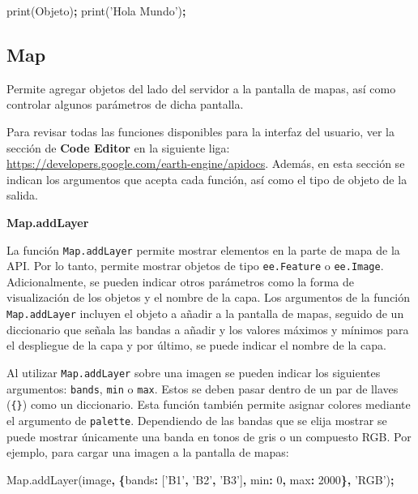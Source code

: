 \documentclass[
]{article}
\newenvironment{Shaded}{\begin{snugshade}}{\end{snugshade}}
\newcommand{\AttributeTok}[1]{\textcolor[rgb]{0.77,0.63,0.00}{#1}}
\newcommand{\DataTypeTok}[1]{\textcolor[rgb]{0.13,0.29,0.53}{#1}}
\newcommand{\DecValTok}[1]{\textcolor[rgb]{0.00,0.00,0.81}{#1}}
\newcommand{\NormalTok}[1]{#1}
\newcommand{\OperatorTok}[1]{\textcolor[rgb]{0.81,0.36,0.00}{\textbf{#1}}}
\newcommand{\StringTok}[1]{\textcolor[rgb]{0.31,0.60,0.02}{#1}}
\newcommand{\VariableTok}[1]{\textcolor[rgb]{0.00,0.00,0.00}{#1}}
\begin{document}
\begin{Shaded}
\begin{Highlighting}[]
\AttributeTok{print}\NormalTok{(Objeto)}\OperatorTok{;}
\AttributeTok{print}\NormalTok{(}\StringTok{'Hola Mundo'}\NormalTok{)}\OperatorTok{;}
\end{Highlighting}
\end{Shaded}

\hypertarget{map}{%
\subsection{Map}\label{map}}

Permite agregar objetos del lado del servidor a la pantalla de mapas,
así como controlar algunos parámetros de dicha pantalla.

\begin{tipblock}
Para revisar todas las funciones disponibles para la interfaz del
usuario, ver la sección de \textbf{Code Editor } en la siguiente liga:
\url{https://developers.google.com/earth-engine/apidocs}. Además, en
esta sección se indican los argumentos que acepta cada función, así como
el tipo de objeto de la salida.

\end{tipblock}

\textbf{Map.addLayer}

La función \texttt{Map.addLayer} permite mostrar elementos en la parte
de mapa de la API. Por lo tanto, permite mostrar objetos de tipo
\texttt{ee.Feature} o \texttt{ee.Image}. Adicionalmente, se pueden
indicar otros parámetros como la forma de visualización de los objetos y
el nombre de la capa. Los argumentos de la función \texttt{Map.addLayer}
incluyen el objeto a añadir a la pantalla de mapas, seguido de un
diccionario que señala las bandas a añadir y los valores máximos y
mínimos para el despliegue de la capa y por último, se puede indicar el
nombre de la capa.

Al utilizar \texttt{Map.addLayer} sobre una imagen se pueden indicar los
siguientes argumentos: \texttt{bands}, \texttt{min} o \texttt{max}.
Estos se deben pasar dentro de un par de llaves (\texttt{\{\}}) como un
diccionario. Esta función también permite asignar colores mediante el
argumento de \texttt{palette}. Dependiendo de las bandas que se elija
mostrar se puede mostrar únicamente una banda en tonos de gris o un
compuesto RGB. Por ejemplo, para cargar una imagen a la pantalla de
mapas:

\begin{Shaded}
\begin{Highlighting}[]
\VariableTok{Map}\NormalTok{.}\AttributeTok{addLayer}\NormalTok{(image}\OperatorTok{,} \OperatorTok{\{}\DataTypeTok{bands}\OperatorTok{:}\NormalTok{ [}\StringTok{'B1'}\OperatorTok{,} \StringTok{'B2'}\OperatorTok{,} \StringTok{'B3'}\NormalTok{]}\OperatorTok{,} \DataTypeTok{min}\OperatorTok{:} \DecValTok{0}\OperatorTok{,} \DataTypeTok{max}\OperatorTok{:} \DecValTok{2000}\OperatorTok{\},} \StringTok{'RGB'}\NormalTok{)}\OperatorTok{;}
\end{Highlighting}
\end{Shaded}
\end{document}
